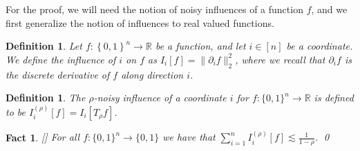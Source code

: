 \documentclass[10pt]{article}
\newcommand{\set}[1]{{\left\{#1\right\}}}
\newcommand{\norm}[1]{\lVert #1\rVert}
\newcommand{\power}[1]{\set{0,1}^{#1}}
\renewcommand{\ll}{\lesssim}
\newtheorem{definition}[thm]{Definition}
\newtheorem{fact}[thm]{Fact}
\begin{document}
For the proof, we will need the notion of noisy influences of a function $f$, and we first generalize the notion of influences to real valued functions.
\begin{definition}
  Let $f\colon\power{n}\to\mathbb{R}$ be a function, and let $i\in [n]$ be a coordinate.
  We define the influence of $i$ on $f$ as $I_i[f] = \norm{\partial_i f}_2^2$, where
  we recall that $\partial_i f$ is the discrete derivative of $f$ along direction $i$.
\end{definition}
\begin{definition}
  The $\rho$-noisy influence of a coordinate $i$ for $f\colon\{0,1\}^n\to\mathbb{R}$ is defined to be
  $I_i^{(\rho)}[f] = I_i[T_{\rho} f]$.
\end{definition}

\begin{fact}\label{fact:sum_of_noisy}[\cite{ODonnell}]
  For all $f\colon\{0,1\}^n\to\{0,1\}$ we have that $\sum\limits_{i=1}^{n} I_i^{(\rho)}[f] \ll \frac{1}{1-\rho}$.
  \qed
\end{fact}
\end{document}
